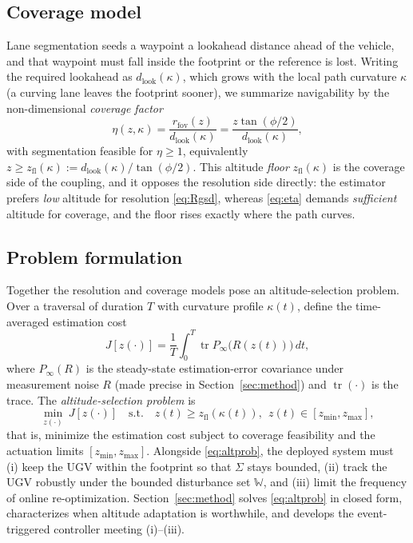 \documentclass{ifacconf}
\begin{document}
\subsection{Coverage model}
\label{sec:coverage}
Lane segmentation seeds a waypoint a lookahead distance ahead of the vehicle, and that waypoint must
fall inside the footprint or the reference is lost. Writing the required lookahead as
$d_{\mathrm{look}}(\kappa)$, which grows with the local path curvature $\kappa$ (a curving lane
leaves the footprint sooner), we summarize navigability by the non-dimensional \emph{coverage factor}
\begin{equation}
\eta(z,\kappa)=\frac{r_{\mathrm{fov}}(z)}{d_{\mathrm{look}}(\kappa)}=\frac{z\tan(\phi/2)}{d_{\mathrm{look}}(\kappa)},
\label{eq:eta}
\end{equation}
with segmentation feasible for $\eta\ge 1$, equivalently $z\ge z_{\mathrm{fl}}(\kappa):=
d_{\mathrm{look}}(\kappa)/\tan(\phi/2)$. This altitude \emph{floor} $z_{\mathrm{fl}}(\kappa)$ is the
coverage side of the coupling, and it opposes the resolution side directly: the estimator prefers
\emph{low} altitude for resolution \eqref{eq:Rgsd}, whereas \eqref{eq:eta} demands \emph{sufficient}
altitude for coverage, and the floor rises exactly where the path curves.

\subsection{Problem formulation}
\label{sec:problem}
Together the resolution and coverage models pose an altitude-selection problem. Over a traversal of
duration $T$ with curvature profile $\kappa(t)$, define the time-averaged estimation cost
\begin{equation}
J[z(\cdot)]=\frac{1}{T}\int_0^T \operatorname{tr}P_\infty\!\big(R(z(t))\big)\,dt,
\label{eq:Jest}
\end{equation}
where $P_\infty(R)$ is the steady-state estimation-error covariance under measurement noise $R$
(made precise in Section~\ref{sec:method}) and $\operatorname{tr}(\cdot)$ is the trace. The
\emph{altitude-selection problem} is
\begin{equation}
\min_{z(\cdot)}\ J[z(\cdot)]\quad\text{s.t.}\quad z(t)\ge z_{\mathrm{fl}}(\kappa(t)),\ \ z(t)\in[z_{\min},z_{\max}],
\label{eq:altprob}
\end{equation}
that is, minimize the estimation cost subject to coverage feasibility and the actuation limits
$[z_{\min},z_{\max}]$. Alongside \eqref{eq:altprob}, the deployed system must (i) keep the UGV within
the footprint so that $\Sigma$ stays bounded, (ii) track the UGV robustly under the bounded
disturbance set $\mathbb{W}$, and (iii) limit the frequency of online re-optimization.
Section~\ref{sec:method} solves \eqref{eq:altprob} in closed form, characterizes when altitude
adaptation is worthwhile, and develops the event-triggered controller meeting (i)--(iii).
\end{document}
